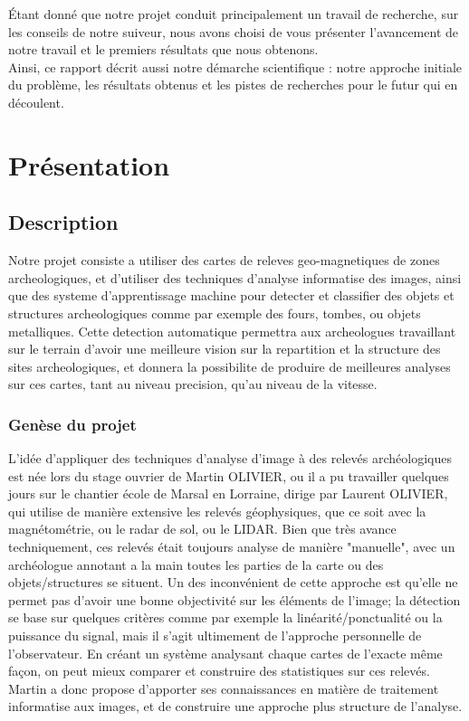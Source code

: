 \documentclass[a4paper, 12pt, titlepage, oneside, french]{article}
\begin{document}
	Étant donné que notre projet conduit principalement un travail de recherche, sur les conseils de notre suiveur, nous avons choisi de vous présenter l'avancement de notre travail et le premiers résultats que nous obtenons. \\
	Ainsi, ce rapport décrit aussi notre démarche scientifique : notre approche initiale du problème, les résultats obtenus et les pistes de recherches pour le futur qui en découlent.

	\newpage
\section{Présentation}
	\subsection{Description}%
		Notre projet consiste a utiliser des cartes de releves geo-magnetiques de zones archeologiques, et d'utiliser des techniques d'analyse informatise des images, ainsi que des systeme d'apprentissage machine pour detecter et classifier des objets et structures archeologiques comme par exemple des fours, tombes, ou objets metalliques. 
		Cette detection automatique permettra aux archeologues travaillant sur le terrain d'avoir une meilleure vision sur la repartition et la structure des sites archeologiques, et donnera la possibilite de produire de meilleures analyses sur ces cartes, tant au niveau precision, qu'au niveau de la vitesse.
		
		\subsubsection{Genèse du projet}
		L'idée d'appliquer des techniques d'analyse d'image à des relevés archéologiques est née lors du stage ouvrier de Martin OLIVIER, ou il a pu travailler quelques jours sur le chantier école de Marsal en Lorraine, dirige par Laurent OLIVIER, qui utilise de manière extensive les relevés géophysiques, que ce soit avec la magnétométrie, ou le radar de sol, ou le LIDAR. Bien que très avance techniquement, ces relevés était toujours analyse de manière "manuelle", avec un archéologue annotant a la main toutes les parties de la carte ou des objets/structures se situent. Un des inconvénient de cette approche est qu'elle ne permet pas d'avoir une bonne objectivité sur les éléments de l'image; la détection se base sur quelques critères comme par exemple la linéarité/ponctualité ou la puissance du signal, mais il s'agit ultimement de l'approche personnelle de l'observateur. En créant un système analysant chaque cartes de l'exacte même façon, on peut mieux comparer et construire des statistiques sur ces relevés. Martin a donc propose d'apporter ses connaissances en matière de traitement informatise aux images, et de construire une approche plus structure de l'analyse.
\end{document}
